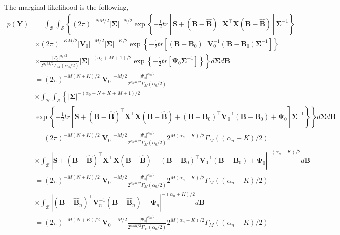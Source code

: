 The marginal likelihood is the following,
\begin{align*}
	p({\bm{Y}})&=\int_{\mathcal{B}}\int_{\mathcal{S}}\left\{ (2\pi)^{-NM/2} |{{\bm \Sigma}}|^{-N/2}\exp\left\lbrace -\frac{1}{2}tr\left[{\bm{S}}+({\bm{B}}-\widehat{\bm{B}})^{\top}{\bm{X}}^{\top}{\bm{X}}({\bm{B}}-\widehat{\bm{B}})\right]{{\bm \Sigma}}^{-1}\right\rbrace\right.\\
	&\times (2\pi)^{-KM/2}\left|{\bm V}_0 \right|^{-M/2} \left|{\bm{\Sigma}} \right|^{-K/2}\exp\left\lbrace -\frac{1}{2}tr\left[({\bm{B}}-{\bm{B}}_{0})^{\top}{\bm{V}}_{0}^{-1}({\bm{B}}-{\bm{B}}_{0}){\bm \Sigma}^{-1}\right]\right\rbrace \\
	&\left. \times \frac{|\Psi_0|^{\alpha_0/2}}{2^{\alpha_0M/2}\Gamma_M(\alpha_0/2)} \left|{\bm \Sigma} \right|^{-(\alpha_{0}+M+1)/2}\exp\left\lbrace -\frac{1}{2}tr \left[ {\bm{\Psi}}_{0} {\bm \Sigma}^{-1}\right] \right\rbrace \right\} d{\bm{\Sigma}} d{\bm B}\\
	&=(2\pi)^{-M(N+K)/2}\left|{\bm V}_0\right|^{-M/2}\frac{|\Psi_0|^{\alpha_0/2}}{2^{\alpha_0M/2}\Gamma_M(\alpha_0/2)}\\
	&\times\int_{\mathcal{B}}\int_{\mathcal{S}} \left\{ \left|{\bm \Sigma} \right|^{-(\alpha_{0}+N+K+M+1)/2}\right.\\
	&\left. \exp\left\lbrace -\frac{1}{2}tr\left[{\bm{S}}+({\bm{B}}-\widehat{\bm{B}})^{\top}{\bm{X}}^{\top}{\bm{X}}({\bm{B}}-\widehat{\bm{B}})+({\bm{B}}-{\bm{B}}_{0})^{\top}{\bm{V}}_{0}^{-1}({\bm{B}}-{\bm{B}}_{0})+{\bm{\Psi}}_0\right]{{\bm \Sigma}}^{-1}\right\rbrace\right\}d{\bm{\Sigma}} d{\bm B}\\
	&=(2\pi)^{-M(N+K)/2}\left|{\bm V}_0\right|^{-M/2}\frac{|\Psi_0|^{\alpha_0/2}}{2^{\alpha_0M/2}\Gamma_M(\alpha_0/2)}2^{M(\alpha_n+K)/2}\Gamma_M((\alpha_n+K)/2)\\
	&\times \int_{\mathcal{B}}\left|{\bm{S}}+({\bm{B}}-\widehat{\bm{B}})^{\top}{\bm{X}}^{\top}{\bm{X}}({\bm{B}}-\widehat{\bm{B}})+({\bm{B}}-{\bm{B}}_{0})^{\top}{\bm{V}}_{0}^{-1}({\bm{B}}-{\bm{B}}_{0})+{\bm{\Psi}}_0\right|^{-(\alpha_n+K)/2}d{\bm{B}}\\
	&=(2\pi)^{-M(N+K)/2}\left|{\bm V}_0\right|^{-M/2}\frac{|\Psi_0|^{\alpha_0/2}}{2^{\alpha_0M/2}\Gamma_M(\alpha_0/2)}2^{M(\alpha_n+K)/2}\Gamma_M((\alpha_n+K)/2)\\
	&\times \int_{\mathcal{B}}\left|({\bm{B}}-\widehat{\bm{B}}_n)^{\top}{\bm{V}}_n^{-1}({\bm{B}}-\widehat{\bm{B}}_n)+{\bm{\Psi}}_n\right|^{-(\alpha_n+K)/2}d{\bm{B}}\\ 
	&=(2\pi)^{-M(N+K)/2}\left|{\bm V}_0\right|^{-M/2}\frac{|\Psi_0|^{\alpha_0/2}}{2^{\alpha_0M/2}\Gamma_M(\alpha_0/2)}2^{M(\alpha_n+K)/2}\Gamma_M((\alpha_n+K)/2)\\

\end{align*}
